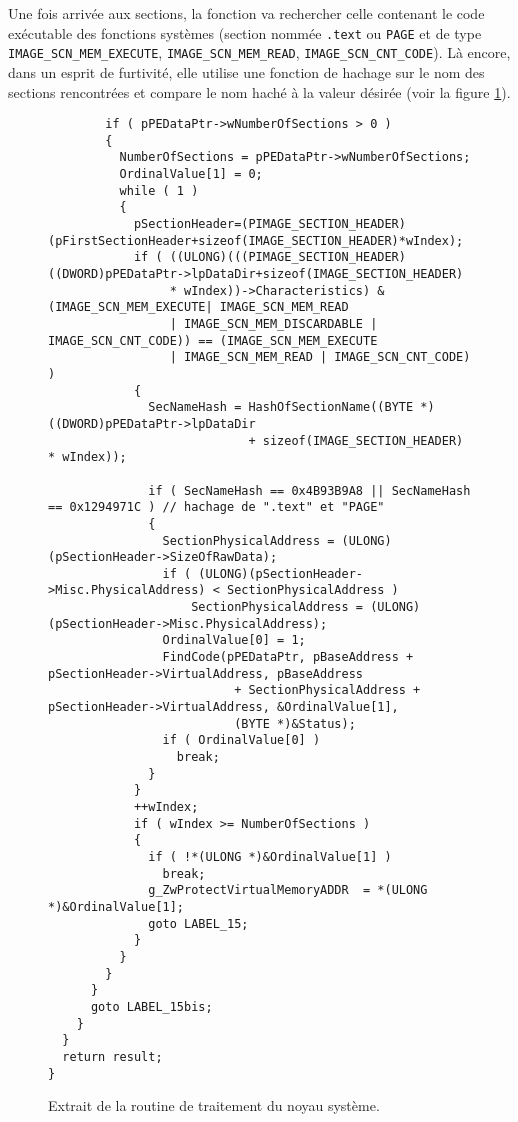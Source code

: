 \documentclass[times,11pt,fullpage]{article}
\begin{document}
Une fois arrivée aux sections, la fonction va rechercher celle contenant le code exécutable des fonctions systèmes (section nommée \texttt{.text} ou \texttt{PAGE} et de type \texttt{IMAGE\_SCN\_MEM\_EXECUTE}, \texttt{IMAGE\_SCN\_MEM\_READ}, \texttt{IMAGE\_SCN\_CNT\_CODE}). Là encore, dans un esprit de furtivité, elle utilise une fonction de hachage sur le nom des sections rencontrées et compare le nom haché à la valeur désirée (voir la figure \ref{fig:kernel}). 
\begin{figure}
\scriptsize
\begin{framed}
\begin{verbatim}
        if ( pPEDataPtr->wNumberOfSections > 0 )
        {
          NumberOfSections = pPEDataPtr->wNumberOfSections;
          OrdinalValue[1] = 0;
          while ( 1 )
          {
            pSectionHeader=(PIMAGE_SECTION_HEADER)(pFirstSectionHeader+sizeof(IMAGE_SECTION_HEADER)*wIndex);
            if ( ((ULONG)(((PIMAGE_SECTION_HEADER)((DWORD)pPEDataPtr->lpDataDir+sizeof(IMAGE_SECTION_HEADER) 
                 * wIndex))->Characteristics) & (IMAGE_SCN_MEM_EXECUTE| IMAGE_SCN_MEM_READ 
                 | IMAGE_SCN_MEM_DISCARDABLE | IMAGE_SCN_CNT_CODE)) == (IMAGE_SCN_MEM_EXECUTE
                 | IMAGE_SCN_MEM_READ | IMAGE_SCN_CNT_CODE) )  
            {
              SecNameHash = HashOfSectionName((BYTE *)((DWORD)pPEDataPtr->lpDataDir
                            + sizeof(IMAGE_SECTION_HEADER) * wIndex));

              if ( SecNameHash == 0x4B93B9A8 || SecNameHash == 0x1294971C ) // hachage de ".text" et "PAGE"
              {
                SectionPhysicalAddress = (ULONG)(pSectionHeader->SizeOfRawData);
                if ( (ULONG)(pSectionHeader->Misc.PhysicalAddress) < SectionPhysicalAddress )
                    SectionPhysicalAddress = (ULONG)(pSectionHeader->Misc.PhysicalAddress);
                OrdinalValue[0] = 1;                                                            
                FindCode(pPEDataPtr, pBaseAddress + pSectionHeader->VirtualAddress, pBaseAddress 
                          + SectionPhysicalAddress + pSectionHeader->VirtualAddress, &OrdinalValue[1], 
                          (BYTE *)&Status);
                if ( OrdinalValue[0] )
                  break;
              }
            }
            ++wIndex;
            if ( wIndex >= NumberOfSections )
            {
              if ( !*(ULONG *)&OrdinalValue[1] )
                break;
              g_ZwProtectVirtualMemoryADDR  = *(ULONG *)&OrdinalValue[1];   
              goto LABEL_15;
            } 
          } 
        }
      }
      goto LABEL_15bis;
    }
  }
  return result;
}
\end{verbatim}
\end{framed}
\caption{Extrait de la routine de traitement du noyau système.\label{fig:kernel}}
\end{figure}
  
\end{document}
